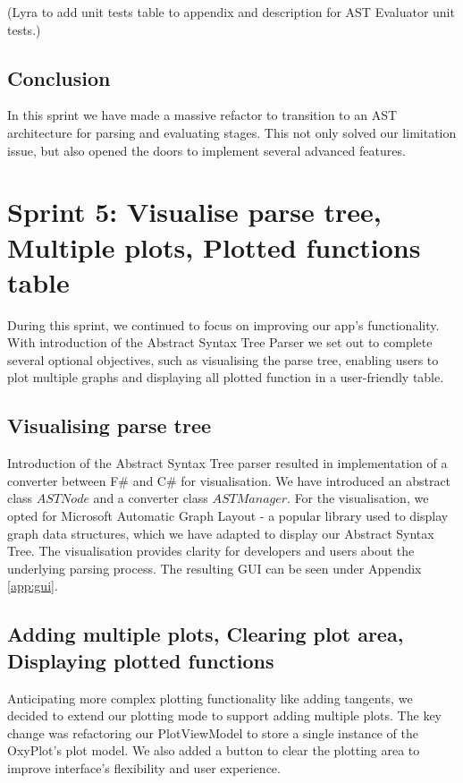 \documentclass[a4paper, oneside, 11pt]{report}
\begin{document}
(Lyra to add unit tests table to appendix and description for AST Evaluator unit tests.)

\subsection{Conclusion}
In this sprint we have made a massive refactor to transition to an AST architecture for parsing and evaluating stages. This not only solved our limitation issue, but also opened the doors to implement several advanced features.

\section{Sprint 5: Visualise parse tree, Multiple plots, Plotted functions table}
During this sprint, we continued to focus on improving our app's functionality. With introduction of the Abstract Syntax Tree Parser we set out to complete several optional objectives, such as visualising the parse tree, enabling users to plot multiple graphs and displaying all plotted function in a user-friendly table.

\subsection{Visualising parse tree}
Introduction of the Abstract Syntax Tree parser resulted in implementation of a converter between F\# and C\# for visualisation. We have introduced an abstract class $ASTNode$ and a converter class $ASTManager$. For the visualisation, we opted for Microsoft Automatic Graph Layout\cite{MSAGL} - a popular library used to display graph data structures, which we have adapted to display our Abstract Syntax Tree. The visualisation provides clarity for developers and users about the underlying parsing process. The resulting GUI can be seen under Appendix \ref{app:gui}.

\subsection{Adding multiple plots, Clearing plot area, Displaying plotted functions}
Anticipating more complex plotting functionality like adding tangents, we decided to extend our plotting mode to support adding multiple plots. The key change was refactoring our PlotViewModel to store a single instance of the OxyPlot's plot model. We also added a button to clear the plotting area to improve interface's flexibility and user experience. 
\end{document}
